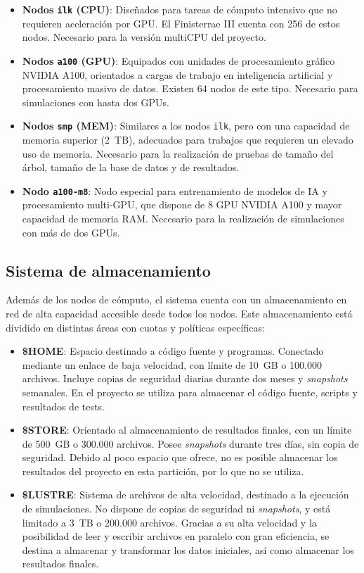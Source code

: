 \begin{itemize}
    \item \textbf{Nodos \texttt{ilk} (CPU)}: Diseñados para tareas de cómputo intensivo que no requieren aceleración por GPU. El Finisterrae III cuenta con 256 de estos nodos.
    Necesario para la versión multiCPU del proyecto.
    \item \textbf{Nodos \texttt{a100} (GPU)}: Equipados con unidades de procesamiento gráfico NVIDIA A100, orientados a cargas de trabajo en inteligencia artificial y procesamiento masivo de datos.
    Existen 64 nodos de este tipo.
    Necesario para simulaciones con hasta dos GPUs.
    \item \textbf{Nodos \texttt{smp} (MEM)}: Similares a los nodos \texttt{ilk}, pero con una capacidad de memoria superior (2~TB), adecuados para trabajos que requieren un elevado uso de memoria.
    Necesario para la realización de pruebas de tamaño del árbol, tamaño de la base de datos y de resultados.
    \item \textbf{Nodo \texttt{a100-m8}}: Nodo especial para entrenamiento de modelos de IA y procesamiento multi-GPU, que dispone de 8 GPU NVIDIA A100 y mayor capacidad de memoria RAM.
    Necesario para la realización de simulaciones con más de dos GPUs.
\end{itemize}

\subsection{Sistema de almacenamiento}\label{subsec:sistema-de-almacenamiento}

Además de los nodos de cómputo, el sistema cuenta con un almacenamiento en red de alta capacidad accesible desde todos los nodos.
Este almacenamiento está dividido en distintas áreas con cuotas y políticas específicas:

\begin{itemize}
    \item \textbf{\$HOME}: Espacio destinado a código fuente y programas. 
    Conectado mediante un enlace de baja velocidad, con límite de 10~GB o 100.000 archivos. 
    Incluye copias de seguridad diarias durante dos meses y \textit{snapshots} semanales.
    En el proyecto se utiliza para almacenar el código fuente, scripts y resultados de tests.
    \item \textbf{\$STORE}: Orientado al almacenamiento de resultados finales, con un límite de 500~GB o 300.000 archivos.
    Posee \textit{snapshots} durante tres días, sin copia de seguridad.
    Debido al poco espacio que ofrece, no es posible almacenar los resultados del proyecto en esta partición, por lo que no se utiliza.
    \item \textbf{\$LUSTRE}: Sistema de archivos de alta velocidad, destinado a la ejecución de simulaciones.
    No dispone de copias de seguridad ni \textit{snapshots}, y está limitado a 3~TB o 200.000 archivos.
    Gracias a su alta velocidad y la posibilidad de leer y escribir archivos en paralelo con gran eficiencia, se destina a almacenar y transformar los datos iniciales, así como almacenar los resultados finales.
\end{itemize}

